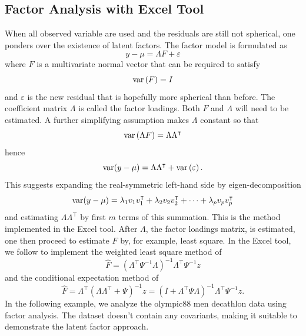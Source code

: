 \documentclass[article]{jss}
\begin{document}
        \subsection[egFactor]{Factor Analysis with Excel Tool}
        When all observed variable are used and the residuals are still not spherical, one ponders over the existence of latent factors. The factor model is formulated as
        $$y  - \mu = \Lambda F + \varepsilon$$
        where $F$ is a multivariate normal vector that can be required to satisfy 
        $${\mathop{\rm var}} \left( F \right) = I$$
        and $\varepsilon$ is the new residual that is hopefully more spherical than before. The coefficient matrix $\Lambda$ is called the factor loadings. Both $F$ and $\Lambda$ will need to be estimated. A further simplifying assumption makes $\Lambda$ constant so that
        $${\mathop{\rm var}} \left( {\Lambda F} \right) = \Lambda {\Lambda ^\intercal}$$
        hence
        $${\mathop{\rm var}} (y - \mu ) = \Lambda {\Lambda ^\intercal} + {\mathop{\rm var}} \left( \varepsilon  \right).$$
        This suggests expanding the real-symmetric left-hand side by eigen-decomposition
        \[{\mathop{\rm var}} (y - \mu ) = {\lambda _1}{v_1}v_1^\intercal + {\lambda _2}{v_2}v_2^\intercal +  \cdots  + {\lambda _p}{v_p}v_p^\intercal\]
        and estimating $\Lambda {\Lambda ^\intercal}$ by first $m$ terms of this summation. This is the method implemented in the Excel tool.
        After $\Lambda$, the factor loadings matrix, is estimated, one then proceed to estimate $F$ by, for example, least square. In the Excel tool, we follow \cite{anderson2003introMVA3e} to implement the weighted least square method of \cite{bartlett1938}
        \[\hat F = {\left( {{\Lambda ^\intercal}{\Psi ^{ - 1}}\Lambda } \right)^{ - 1}}{\Lambda ^\intercal}{\Psi ^{ - 1}}z\]
        and the conditional expectation method of \cite{Thomson1951}
        \[\hat F = {\Lambda ^\intercal}{\left( {\Lambda {\Lambda ^\intercal} + \Psi } \right)^{ - 1}}z = {\left( {I + {\Lambda ^\intercal}\Psi \Lambda } \right)^{ - 1}}{\Lambda ^\intercal}{\Psi ^{ - 1}}z.\]
        In the following example, we analyze the olympic88 men decathlon data using factor analysis. The dataset doesn't contain any covariants, making it suitable to demonstrate the latent factor approach.
        
\end{document}
